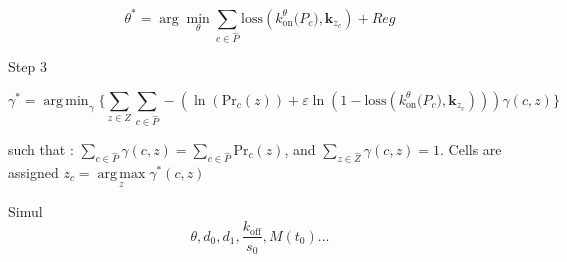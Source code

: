 \documentclass[a4paper, 11pt]{article}
\DeclareMathOperator*{\argmin}{arg\,min}
\DeclareMathOperator*{\argmax}{arg\,max}
\begin{document}
\begin{equation}
\theta^{\ast}
   = \arg\min_{\theta}
      \sum_{c \in \widehat P}
      \mathrm{loss}(
         k^{\theta}_{\mathrm{on}}\!\big(P_c\big)
         , \mathbf{k}_{z_{c}})
      + Reg
\label{eq:GRN_update}
\end{equation}

Step 3

\begin{equation}
\label{eq:basins_update}
\gamma^* = \argmin_{\gamma}\{\sum_{z \in Z}
      \sum_{c \in \widehat P}-\left(\ln\left(\mathrm{Pr}_c(z)\right) + \varepsilon \ln\left(1 - \mathrm{loss}(
         k^{\theta}_{\mathrm{on}}\!\big(P_c\big)
         , \mathbf{k}_{z_{c}})\right)\right) \gamma(c, z)\}
\end{equation}

such that : $\sum\limits_{c \in \widehat P}\gamma(c, z) = \sum\limits_{c \in \widehat P}\mathrm{Pr}_c(z)$, and
$\sum\limits_{z \in \widehat Z}\gamma(c, z) = 1$. Cells are assigned $z_c = \argmax \limits_z \gamma^*(c, z)$ 





Simul
\begin{equation}
\theta, d_{0}, d_{1}, \frac{k_{\mathrm{off}}}{s_{0}}, M(t_{0})...
\end{equation}
\end{document}
